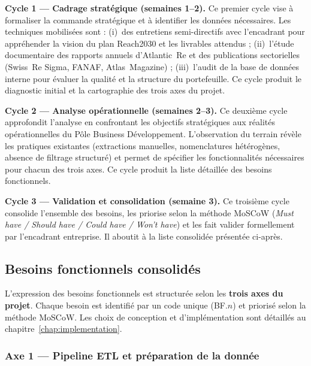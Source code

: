 \documentclass[12pt,a4paper]{report}
\begin{document}
\textbf{Cycle 1 --- Cadrage stratégique (semaines 1--2).} Ce premier cycle vise à formaliser la commande stratégique et à identifier les données nécessaires. Les techniques mobilisées sont : (i)~des entretiens semi-directifs avec l'encadrant pour appréhender la vision du plan Reach2030 et les livrables attendus ; (ii)~l'étude documentaire des rapports annuels d'Atlantic~Re et des publications sectorielles (Swiss~Re Sigma, FANAF, Atlas~Magazine) ; (iii)~l'audit de la base de données interne pour évaluer la qualité et la structure du portefeuille. Ce cycle produit le diagnostic initial et la cartographie des trois axes du projet.

\textbf{Cycle 2 --- Analyse opérationnelle (semaines 2--3).} Ce deuxième cycle approfondit l'analyse en confrontant les objectifs stratégiques aux réalités opérationnelles du Pôle Business Développement. L'observation du terrain révèle les pratiques existantes (extractions manuelles, nomenclatures hétérogènes, absence de filtrage structuré) et permet de spécifier les fonctionnalités nécessaires pour chacun des trois axes. Ce cycle produit la liste détaillée des besoins fonctionnels.

\textbf{Cycle 3 --- Validation et consolidation (semaine 3).} Ce troisième cycle consolide l'ensemble des besoins, les priorise selon la méthode MoSCoW (\textit{Must have / Should have / Could have / Won't have}) et les fait valider formellement par l'encadrant entreprise. Il aboutit à la liste consolidée présentée ci-après.

\subsection{Besoins fonctionnels consolidés}

L'expression des besoins fonctionnels est structurée selon les \textbf{trois axes du projet}. Chaque besoin est identifié par un code unique (BF.$n$) et priorisé selon la méthode MoSCoW. Les choix de conception et d'implémentation sont détaillés au chapitre~\ref{chap:implementation}.

\subsubsection{Axe 1 --- Pipeline ETL et préparation de la donnée}
\end{document}
